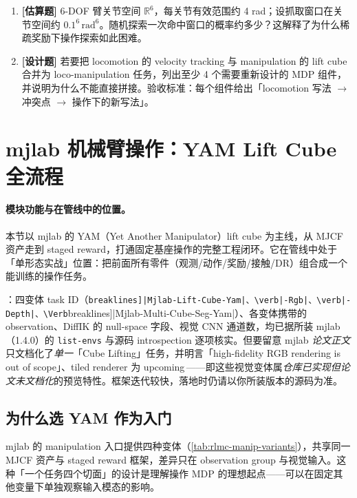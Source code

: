 \begin{practice}[本节练习]
\begin{enumerate}
  \item \textbf{[估算题]} 6-DOF 臂关节空间 $\mathbb{R}^6$，每关节有效范围约 4 rad；设抓取窗口在关节空间约 $0.1^6\,\mathrm{rad}^6$。随机探索一次命中窗口的概率约多少？这解释了为什么稀疏奖励下操作探索如此困难。
  \item \textbf{[设计题]} 若要把 locomotion 的 velocity tracking 与 manipulation 的 lift cube 合并为 loco-manipulation 任务，列出至少 4 个需要重新设计的 MDP 组件，并说明为什么不能直接拼接。验收标准：每个组件给出「locomotion 写法 $\to$ 冲突点 $\to$ 操作下的新写法」。
\end{enumerate}
\end{practice}

\section{mjlab 机械臂操作：YAM Lift Cube 全流程}
\label{sec:rlmc-manip-mjlab}

\paragraph{模块功能与在管线中的位置。}本节以 mjlab 的 YAM（Yet Another Manipulator）lift cube 为主线，从 MJCF 资产走到 staged reward，打通固定基座操作的完整工程闭环。它在管线中处于「单形态实战」位置：把前面所有零件（观测/动作/奖励/接触/DR）组合成一个能训练的操作任务。

：四变体 task ID（\Verb[breaklines]|Mjlab-Lift-Cube-Yam|、\verb|-Rgb|、\verb|-Depth|、\Verb[breaklines]|Mjlab-Multi-Cube-Seg-Yam|）、各变体携带的 observation、DiffIK 的 null-space 字段、视觉 CNN 通道数，均已据所装 mjlab（1.4.0）的 \verb|list-envs| 与源码 introspection 逐项核实。但要留意 mjlab \emph{论文正文}只文档化了\emph{单一}「Cube Lifting」任务，并明言「high-fidelity RGB rendering is out of scope」、tiled renderer 为 upcoming\,\cite{zakka2026mjlab}——即这些视觉变体属\emph{仓库已实现但论文未文档化}的预览特性。框架迭代较快，落地时仍请以你所装版本的源码为准。

\subsection{为什么选 YAM 作为入门}
\label{sec:rlmc-manip-yam}

mjlab 的 manipulation 入口提供四种变体（\cref{tab:rlmc-manip-variants}），共享同一 MJCF 资产与 staged reward 框架，差异只在 observation group 与视觉输入。这种「一个任务四个切面」的设计是理解操作 MDP 的理想起点——可以在固定其他变量下单独观察输入模态的影响。

